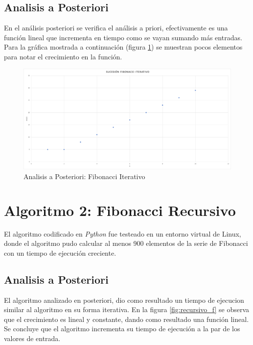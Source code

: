     \subsection{Analisis a Posteriori}
        En el análisis posteriori se verifica el análisis a priori, efectivamente es una función lineal que incrementa en tiempo como se vayan sumando más entradas. Para la gráfica mostrada a continuación (figura \ref{fig:iterativo2_f}) se muestran pocos elementos para notar el crecimiento en la función.
        \begin{figure}[htp!]
            \centering
            \includegraphics[width=1 \textwidth]{Images/posteriori_iterativo.png}  
            \caption{Analisis a Posteriori: Fibonacci Iterativo}
            \label{fig:iterativo2_f}
        \end{figure}
    
    
    
    
    \newpage
    \section{Algoritmo 2: Fibonacci Recursivo}
        El algoritmo codificado en \textit{Python} fue testeado en un entorno virtual de Linux, donde el algoritmo pudo calcular al menos 900 elementos de la serie de Fibonacci con un tiempo de ejecución creciente. 
    \subsection{Analisis a Posteriori}
        El algoritmo analizado en posteriori, dio como resultado un tiempo de ejecucion similar al algoritmo en su forma iterativa. En la figura \ref{fig:recursivo_f} se observa que el crecimiento es lineal y constante, dando como resultado una función lineal. Se concluye que el algoritmo incrementa su tiempo de ejecución a la par de los valores de entrada. 
    
